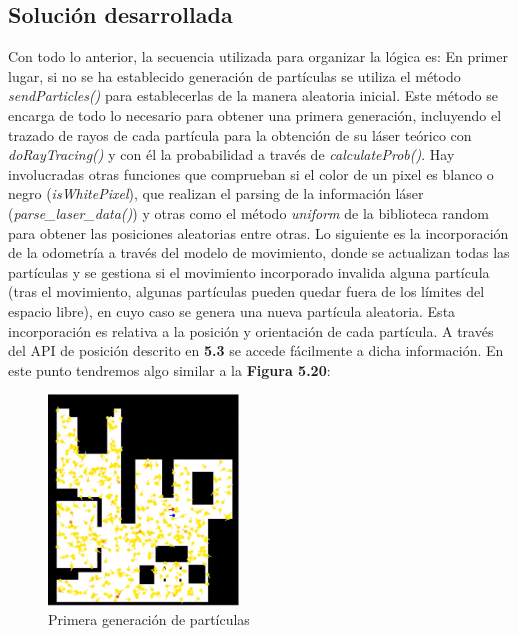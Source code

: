 \subsection{Solución desarrollada}
Con todo lo anterior, la secuencia utilizada para organizar la lógica es:
En primer lugar, si no se ha establecido generación de partículas se utiliza el método \textit{sendParticles()} para establecerlas de la manera aleatoria inicial. Este método se encarga de todo lo necesario para obtener una primera generación, incluyendo el trazado de rayos de cada partícula para la obtención de su láser teórico con \textit{doRayTracing()} y con él la probabilidad a través de \textit{calculateProb()}. Hay involucradas otras funciones que comprueban si el color de un pixel es blanco o negro (\textit{isWhitePixel}), que realizan el parsing de la información láser (\textit{parse\_laser\_data()}) y otras como el método \textit{uniform} de la biblioteca random para obtener las posiciones aleatorias entre otras. Lo siguiente es la incorporación de la odometría a través del modelo de movimiento, donde se actualizan todas las partículas y se gestiona si el movimiento incorporado invalida alguna partícula (tras el movimiento, algunas partículas pueden quedar fuera de los límites del espacio libre), en cuyo caso se genera una nueva partícula aleatoria. Esta incorporación es relativa a la posición y orientación de cada partícula. A través del API de posición descrito en \textbf{5.3} se accede fácilmente a dicha información. En este punto tendremos algo similar a la \textbf{Figura 5.20}:

\begin{figure}[H]
\begin{center}
	\includegraphics[width=0.45\textwidth]{figures/primerageneracion.png}
	\caption{Primera generación de partículas}
	\label{fig.primerageneracion}
	\end{center}
\end{figure}  

